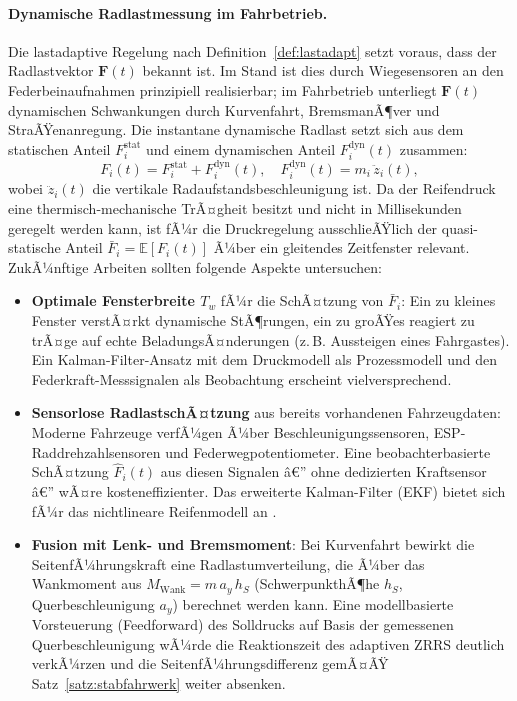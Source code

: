 ﻿\documentclass[a4paper,12pt]{article}
\theoremstyle{definition}
\begin{document}
\paragraph{Dynamische Radlastmessung im Fahrbetrieb.}
Die lastadaptive Regelung nach Definition~\ref{def:lastadapt} setzt voraus,
dass der Radlastvektor $\mathbf{F}(t)$ bekannt ist. Im Stand ist dies durch
Wiegesensoren an den Federbeinaufnahmen prinzipiell realisierbar; im
Fahrbetrieb unterliegt $\mathbf{F}(t)$ dynamischen Schwankungen durch
Kurvenfahrt, BremsmanÃ¶ver und StraÃŸenanregung. Die instantane dynamische
Radlast setzt sich aus dem statischen Anteil $F^{\text{stat}}_i$ und einem
dynamischen Anteil $F^{\text{dyn}}_i(t)$ zusammen:
\[
    F_i(t) = F^{\text{stat}}_i + F^{\text{dyn}}_i(t),
    \quad
    F^{\text{dyn}}_i(t) = m_i\,\ddot{z}_i(t),
\]
wobei $\ddot{z}_i(t)$ die vertikale Radaufstandsbeschleunigung ist.
Da der Reifendruck eine thermisch-mechanische TrÃ¤gheit besitzt und nicht
in Millisekunden geregelt werden kann, ist fÃ¼r die
Druckregelung ausschlieÃŸlich der quasi-statische Anteil
$\bar{F}_i = \mathbb{E}[F_i(t)]$ Ã¼ber ein gleitendes Zeitfenster relevant.
ZukÃ¼nftige Arbeiten sollten folgende Aspekte untersuchen:
\begin{itemize}
    \item \textbf{Optimale Fensterbreite $T_w$} fÃ¼r die SchÃ¤tzung von
    $\bar{F}_i$: Ein zu kleines Fenster verstÃ¤rkt dynamische StÃ¶rungen,
    ein zu groÃŸes reagiert zu trÃ¤ge auf echte BeladungsÃ¤nderungen
    (z.\,B. Aussteigen eines Fahrgastes). Ein Kalman-Filter-Ansatz
    \cite{kalman1960} mit dem Druckmodell als Prozessmodell und den
    Federkraft-Messsignalen als Beobachtung erscheint vielversprechend.
    \item \textbf{Sensorlose RadlastschÃ¤tzung} aus bereits vorhandenen
    Fahrzeugdaten: Moderne Fahrzeuge verfÃ¼gen Ã¼ber Beschleunigungssensoren,
    ESP-Raddrehzahlsensoren und Federwegpotentiometer. Eine beobachterbasierte
    SchÃ¤tzung $\hat{F}_i(t)$ aus diesen Signalen â€” ohne dedizierten
    Kraftsensor â€” wÃ¤re kosteneffizienter. Das erweiterte Kalman-Filter (EKF)
    bietet sich fÃ¼r das nichtlineare Reifenmodell an \cite{rajamani}.
    \item \textbf{Fusion mit Lenk- und Bremsmoment}: Bei Kurvenfahrt
    bewirkt die Seiten\-fÃ¼hrungs\-kraft eine Radlastumverteilung, die Ã¼ber
    das Wankmoment aus $M_{\text{Wank}} = m\,a_y\,h_S$ (SchwerpunkthÃ¶he $h_S$,
    Querbeschleunigung $a_y$) berechnet werden kann. Eine modellbasierte
    Vorsteuerung (Feedforward) des Solldrucks auf Basis der
    gemessenen Querbeschleunigung wÃ¼rde die Reaktionszeit des adaptiven
    ZRRS deutlich verkÃ¼rzen und die SeitenfÃ¼hrungsdifferenz gemÃ¤ÃŸ
    Satz~\ref{satz:stabfahrwerk} weiter absenken.
\end{itemize}
\end{document}
